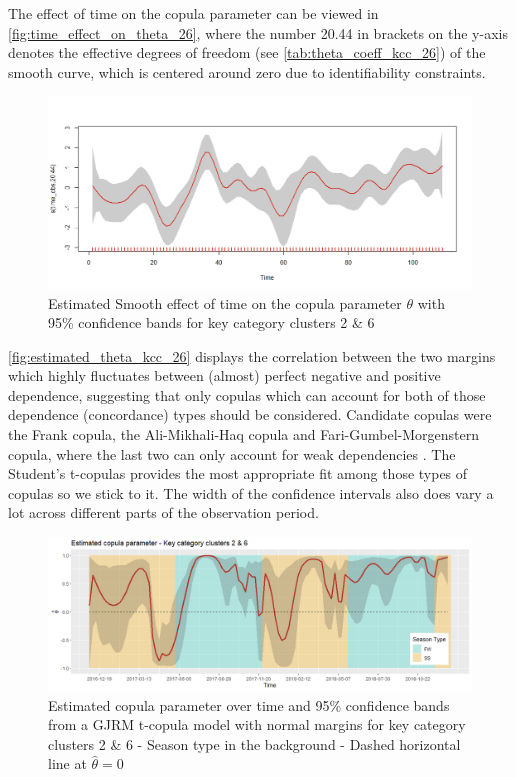 The effect of time on the copula parameter can be viewed in \autoref{fig:time_effect_on_theta_26}, where the number 20.44 in brackets on the y-axis denotes the effective degrees of freedom (see \autoref{tab:theta_coeff_kcc_26}) of the smooth curve, which is centered around zero due to identifiability constraints.
\\

\begin{figure}[H]
\centering
  \includegraphics[width=0.95\linewidth]{figures/time_effect_on_theta_26.png}
  \caption{Estimated Smooth effect of time on the copula parameter $\theta$ with 95\% confidence bands for key category clusters 2 \& 6}
  \label{fig:time_effect_on_theta_26}
\end{figure}



\autoref{fig:estimated_theta_kcc_26} displays the correlation between the two margins which highly fluctuates between (almost) perfect negative and positive dependence, suggesting that only copulas which can account for both of those dependence (concordance) types should be considered. Candidate copulas were the Frank copula, the Ali-Mikhali-Haq copula and Fari-Gumbel-Morgenstern copula, where the last two can only account for weak dependencies \citep{marra1605bivariate}. The Student's t-copulas provides the most appropriate fit among those types of copulas so we stick to it. The width of the confidence intervals also does vary a lot across different parts of the observation period. \\



\begin{figure}[H]
\centering
  \includegraphics[width=0.95\linewidth]{figures/estimated_theta_kcc_26.png}
  \caption{Estimated copula parameter over time and 95\% confidence bands from a \ac{GJRM} t-copula model with normal margins for key category clusters 2 \& 6 - Season type in the background - Dashed horizontal line at $\hat{\theta} = 0$}
  \label{fig:estimated_theta_kcc_26}
\end{figure}




